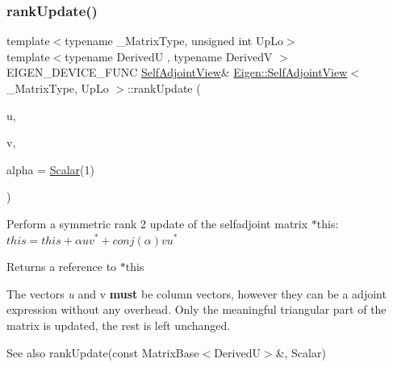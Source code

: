 \subsubsection{\texorpdfstring{rankUpdate()}{rankUpdate()}\hspace{0.1cm}{\footnotesize\ttfamily [1/2]}}
{\footnotesize\ttfamily template$<$typename \+\_\+\+Matrix\+Type, unsigned int Up\+Lo$>$ \\
template$<$typename DerivedU , typename DerivedV $>$ \\
E\+I\+G\+E\+N\+\_\+\+D\+E\+V\+I\+C\+E\+\_\+\+F\+U\+NC \mbox{\hyperlink{class_eigen_1_1_self_adjoint_view}{Self\+Adjoint\+View}}\& \mbox{\hyperlink{class_eigen_1_1_self_adjoint_view}{Eigen\+::\+Self\+Adjoint\+View}}$<$ \+\_\+\+Matrix\+Type, Up\+Lo $>$\+::rank\+Update (\begin{DoxyParamCaption}\item[{const \mbox{\hyperlink{class_eigen_1_1_matrix_base}{Matrix\+Base}}$<$ DerivedU $>$ \&}]{u,  }\item[{const \mbox{\hyperlink{class_eigen_1_1_matrix_base}{Matrix\+Base}}$<$ DerivedV $>$ \&}]{v,  }\item[{const \mbox{\hyperlink{class_eigen_1_1_self_adjoint_view_af52acc0942ece2de9b6db4a99cc6656e}{Scalar}} \&}]{alpha = {\ttfamily \mbox{\hyperlink{class_eigen_1_1_self_adjoint_view_af52acc0942ece2de9b6db4a99cc6656e}{Scalar}}(1)} }\end{DoxyParamCaption})}

Perform a symmetric rank 2 update of the selfadjoint matrix {\ttfamily $\ast$this}\+: $ this = this + \alpha u v^* + conj(\alpha) v u^* $ \begin{DoxyReturn}{Returns}
a reference to {\ttfamily $\ast$this} 
\end{DoxyReturn}
The vectors {\itshape u} and {\ttfamily v} {\bfseries{must}} be column vectors, however they can be a adjoint expression without any overhead. Only the meaningful triangular part of the matrix is updated, the rest is left unchanged.

\begin{DoxySeeAlso}{See also}
rank\+Update(const Matrix\+Base$<$\+Derived\+U$>$\&, Scalar) 
\end{DoxySeeAlso}
\mbox{\label{class_eigen_1_1_self_adjoint_view_a069a85ae895ef96f21a2b180cfe84097}} 

